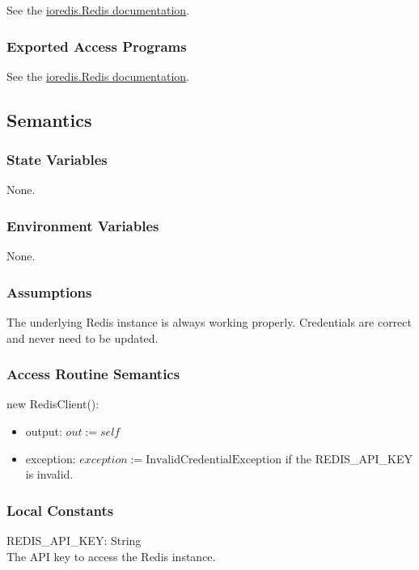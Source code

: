 \documentclass[12pt, titlepage]{article}
\begin{document}
See the \href{https://luin.github.io/ioredis/classes/Redis.html}{ioredis.Redis documentation}. 

\subsubsection{Exported Access Programs}

See the \href{https://luin.github.io/ioredis/classes/Redis.html}{ioredis.Redis documentation}.

\subsection{Semantics}

\subsubsection{State Variables}

None.

\subsubsection{Environment Variables}

None.

\subsubsection{Assumptions}

The underlying Redis instance is always working properly. Credentials are correct and never need to be updated.

\subsubsection{Access Routine Semantics}

\noindent new RedisClient():
\begin{itemize} 
\item output: $out := self$ 
\item exception: $exception := \text{InvalidCredentialException}$ if the REDIS\_API\_KEY is invalid.  
\end{itemize} 

\subsubsection{Local Constants}

REDIS\_API\_KEY: String \\
The API key to access the Redis instance.
  
\end{document}
